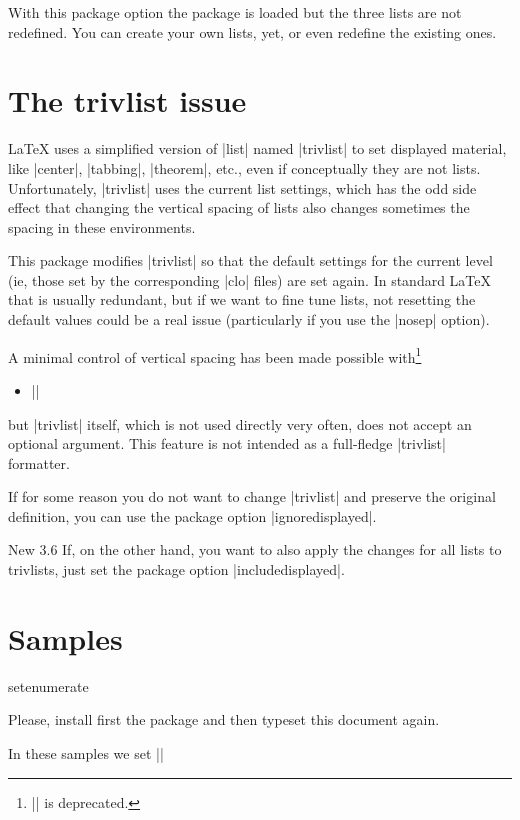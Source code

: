 \documentclass[a4paper]{ltxguide}
\newcommand\New[1]{%
  \colorbox[rgb]{.87, .9, .83}{New #1}\enspace\ignorespaces}
\begin{document}
With this package option the package is loaded but the three
lists are not redefined. You can create your own lists, yet, or
even redefine the existing ones.

\section{The trivlist issue}

\LaTeX{} uses a simplified version of |list| named |trivlist| to set
displayed material, like |center|, |tabbing|, |theorem|, etc., even if
conceptually they are not lists. Unfortunately, |trivlist| uses the
current list settings, which has the odd side effect that changing the
vertical spacing of lists also changes sometimes the spacing in these
environments.

This package modifies |trivlist| so that the default settings for 
the current level (ie, those set by the corresponding |clo| 
files) are set again. In standard \LaTeX{} that is usually redundant, 
but if we want to fine tune lists, not resetting the default values 
could be a real issue (particularly if you use the |nosep| 
option).

A minimal control of vertical spacing has been made possible 
with\footnote{|\string\setdisplayed| is deprecated.}
\begin{itemize}
\item ||
\end{itemize}
but |trivlist| itself, which is not used directly very often, does not
accept an optional argument. This feature is not intended as a
full-fledge |trivlist| formatter.

If for some reason you do not want to change |trivlist| and preserve
the original definition, you can use the package option
|ignoredisplayed|.

\New{3.6} If, on the other hand, you want to also apply the changes for
all lists to trivlists, just set the package option |includedisplayed|.

\section{Samples}

\expandafter\ifx\csname setenumerate\endcsname\relax

Please, install first the package and then typeset this document again.

\else

In these samples we set ||
\end{document}
